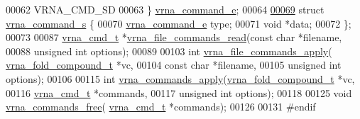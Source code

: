 \begin{DoxyCode}
00062   VRNA\_CMD\_SD
00063 \} \hyperlink{commands_8h_a2ea3e452bf3b3f3ca513b3b081a86137}{vrna\_command\_e};
00064 
\hypertarget{commands_8h_source.tex_l00069}{}\hyperlink{structvrna__command__s}{00069} \textcolor{keyword}{struct }\hyperlink{structvrna__command__s}{vrna\_command\_s} \{
00070   \hyperlink{commands_8h_a2ea3e452bf3b3f3ca513b3b081a86137}{vrna\_command\_e}  type;
00071   \textcolor{keywordtype}{void} *data;
00072 \};
00073 
00087 \hyperlink{structvrna__command__s}{vrna\_cmd\_t} *\hyperlink{commands_8h_a5d2a64331cff5b1059e7d327545d8a63}{vrna\_file\_commands\_read}(\textcolor{keyword}{const} \textcolor{keywordtype}{char} *filename,
00088                                     \textcolor{keywordtype}{unsigned} \textcolor{keywordtype}{int} options);
00089 
00103 \textcolor{keywordtype}{int} \hyperlink{commands_8h_adbe8c9622f7bcc6dcbe3448b98df8656}{vrna\_file\_commands\_apply}( \hyperlink{group__fold__compound_structvrna__fc__s}{vrna\_fold\_compound\_t} *vc,
00104                               \textcolor{keyword}{const} \textcolor{keywordtype}{char} *filename,
00105                               \textcolor{keywordtype}{unsigned} \textcolor{keywordtype}{int} options);
00106 
00115 \textcolor{keywordtype}{int} \hyperlink{commands_8h_a5e993fc4b9602af73aaaab4d3b3cd9a9}{vrna\_commands\_apply}(\hyperlink{group__fold__compound_structvrna__fc__s}{vrna\_fold\_compound\_t} *vc,
00116                         \hyperlink{structvrna__command__s}{vrna\_cmd\_t} *commands,
00117                         \textcolor{keywordtype}{unsigned} \textcolor{keywordtype}{int} options);
00118 
00125 \textcolor{keywordtype}{void} \hyperlink{commands_8h_a926fd7632e68f3da2e2069402b80b1ab}{vrna\_commands\_free}( \hyperlink{structvrna__command__s}{vrna\_cmd\_t} *commands);
00126 
00131 \textcolor{preprocessor}{#endif}
\end{DoxyCode}
